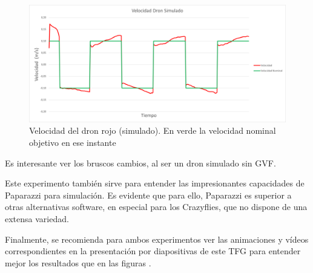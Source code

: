 \begin{figure}[h]
    \centering
    \includegraphics[width=\textwidth]{img/fig/fig4.10-experiment-speed.png}
    \caption{Velocidad del dron rojo (simulado). 
    En \textcolor{Green3}{verde} la velocidad nominal objetivo en ese instante}
    \label{fig:speed-experiment}
\end{figure}

Es interesante ver los bruscos cambios, al ser un dron simulado sin GVF.

Este experimento también sirve para entender las impresionantes capacidades de Paparazzi para simulación.
Es evidente que para ello, Paparazzi es superior a otras alternativas software,
en especial para los Crazyflies, que no dispone de una extensa variedad.

Finalmente, se recomienda para ambos experimentos ver las animaciones y vídeos correspondientes en la presentación por diapositivas de este TFG para entender mejor los resultados que en las figuras \cite{final-results}. 